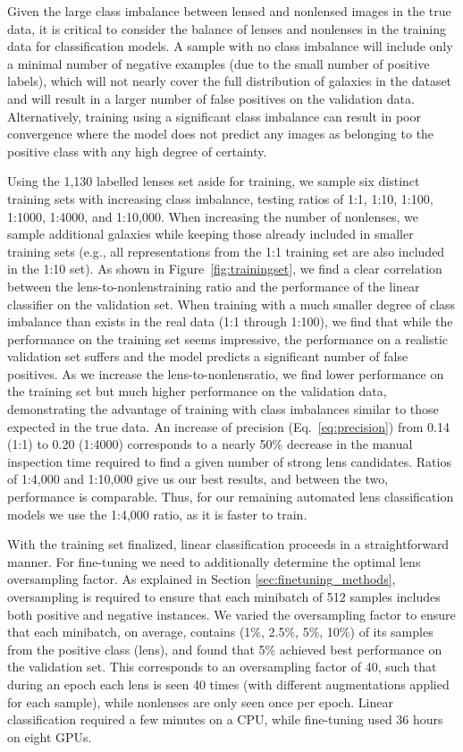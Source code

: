 \documentclass{aastex631}
\begin{document}
Given the large class imbalance between lensed and nonlensed images in the true data, it is critical to consider the balance of lenses and nonlenses in the training data for classification models. A sample with no class imbalance will include only a minimal number of negative examples (due to the small number of positive labels), which will not nearly cover the full distribution of galaxies in the dataset and will result in a larger number of false positives on the validation data. Alternatively, training using a significant class imbalance can result in poor convergence where the model does not predict any images as belonging to the positive class with any high degree of certainty. 

Using the 1,130 labelled lenses set aside for training, we sample six distinct training sets with increasing class imbalance, testing ratios of 1:1, 1:10, 1:100, 1:1000, 1:4000, and 1:10,000. When increasing the number of nonlenses, we sample additional galaxies while keeping those already included in smaller training sets (e.g., all representations from the 1:1 training set are also included in the 1:10 set). As shown in Figure~\ref{fig:trainingset}, we find a clear correlation between the lens-to-nonlenstraining ratio and the performance of the linear classifier on the validation set. When training with a much smaller degree of class imbalance than exists in the real data (1:1 through 1:100), we find that while the performance on the training set seems impressive, the performance on a realistic validation set suffers and the model predicts a significant number of false positives. As we increase the lens-to-nonlensratio, we find lower performance on the training set but much higher performance on the validation data, demonstrating the advantage of training with class imbalances similar to those expected in the true data. An increase of precision (Eq.~\ref{eq:precision}) from 0.14 (1:1) to 0.20 (1:4000) corresponds to a nearly 50\% decrease in the manual inspection time required to find a given number of strong lens candidates. Ratios of 1:4,000 and 1:10,000 give us our best results, and between the two, performance is comparable. Thus, for our remaining automated lens classification models we use the 1:4,000 ratio, as it is faster to train. 

With the training set finalized, linear classification proceeds in a straightforward manner. For fine-tuning we need to additionally determine the optimal lens oversampling factor. As explained in Section \ref{sec:finetuning_methods}, oversampling is required to ensure that each minibatch of 512 samples includes both positive and negative instances. We varied the oversampling factor to ensure that each minibatch, on average, contains (1\%, 2.5\%, 5\%, 10\%) of its samples from the positive class (lens), and found that 5\% achieved best performance on the validation set. This corresponds to an oversampling factor of 40, such that during an epoch each lens is seen 40 times (with different augmentations applied for each sample), while nonlenses are only seen once per epoch. Linear classification required a few minutes on a CPU, while fine-tuning used 36 hours on eight GPUs.
\end{document}
